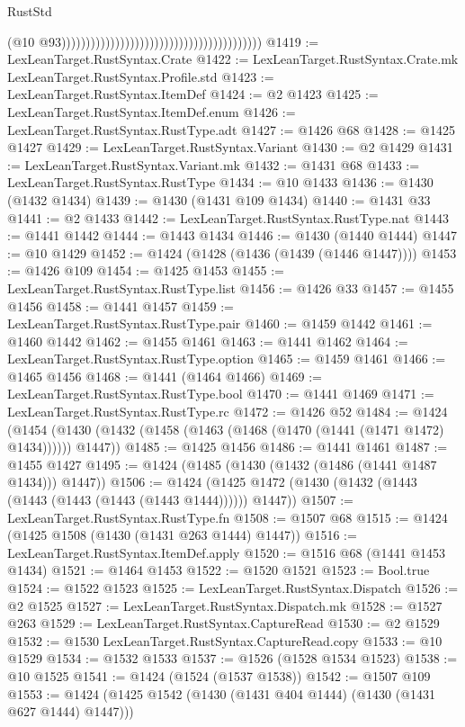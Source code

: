 \begin{lexlean}{RustStd}
\begin{coremodule}
{\begin{coremodule}
{{{{{{{{{{{{{{{{{{{{{{{{{{{{{{{{{{{{{{{{{{{{                                                                                    (@10
                                                                                      @93)))))))))))))))))))))))))))))))))))))))))
@1419 := LexLeanTarget.RustSyntax.Crate
@1422 := LexLeanTarget.RustSyntax.Crate.mk LexLeanTarget.RustSyntax.Profile.std
@1423 := LexLeanTarget.RustSyntax.ItemDef
@1424 := @2 @1423
@1425 := LexLeanTarget.RustSyntax.ItemDef.enum
@1426 := LexLeanTarget.RustSyntax.RustType.adt
@1427 := @1426 @68
@1428 := @1425 @1427
@1429 := LexLeanTarget.RustSyntax.Variant
@1430 := @2 @1429
@1431 := LexLeanTarget.RustSyntax.Variant.mk
@1432 := @1431 @68
@1433 := LexLeanTarget.RustSyntax.RustType
@1434 := @10 @1433
@1436 := @1430 (@1432 @1434)
@1439 := @1430 (@1431 @109 @1434)
@1440 := @1431 @33
@1441 := @2 @1433
@1442 := LexLeanTarget.RustSyntax.RustType.nat
@1443 := @1441 @1442
@1444 := @1443 @1434
@1446 := @1430 (@1440 @1444)
@1447 := @10 @1429
@1452 := @1424 (@1428 (@1436 (@1439 (@1446 @1447))))
@1453 := @1426 @109
@1454 := @1425 @1453
@1455 := LexLeanTarget.RustSyntax.RustType.list
@1456 := @1426 @33
@1457 := @1455 @1456
@1458 := @1441 @1457
@1459 := LexLeanTarget.RustSyntax.RustType.pair
@1460 := @1459 @1442
@1461 := @1460 @1442
@1462 := @1455 @1461
@1463 := @1441 @1462
@1464 := LexLeanTarget.RustSyntax.RustType.option
@1465 := @1459 @1461
@1466 := @1465 @1456
@1468 := @1441 (@1464 @1466)
@1469 := LexLeanTarget.RustSyntax.RustType.bool
@1470 := @1441 @1469
@1471 := LexLeanTarget.RustSyntax.RustType.rc
@1472 := @1426 @52
@1484 := @1424
    (@1454 (@1430 (@1432 (@1458 (@1463 (@1468 (@1470 (@1441 (@1471 @1472) @1434)))))) @1447))
@1485 := @1425 @1456
@1486 := @1441 @1461
@1487 := @1455 @1427
@1495 := @1424 (@1485 (@1430 (@1432 (@1486 (@1441 @1487 @1434))) @1447))
@1506 := @1424 (@1425 @1472 (@1430 (@1432 (@1443 (@1443 (@1443 (@1443 (@1443 @1444)))))) @1447))
@1507 := LexLeanTarget.RustSyntax.RustType.fn
@1508 := @1507 @68
@1515 := @1424 (@1425 @1508 (@1430 (@1431 @263 @1444) @1447))
@1516 := LexLeanTarget.RustSyntax.ItemDef.apply
@1520 := @1516 @68 (@1441 @1453 @1434)
@1521 := @1464 @1453
@1522 := @1520 @1521
@1523 := Bool.true
@1524 := @1522 @1523
@1525 := LexLeanTarget.RustSyntax.Dispatch
@1526 := @2 @1525
@1527 := LexLeanTarget.RustSyntax.Dispatch.mk
@1528 := @1527 @263
@1529 := LexLeanTarget.RustSyntax.CaptureRead
@1530 := @2 @1529
@1532 := @1530 LexLeanTarget.RustSyntax.CaptureRead.copy
@1533 := @10 @1529
@1534 := @1532 @1533
@1537 := @1526 (@1528 @1534 @1523)
@1538 := @10 @1525
@1541 := @1424 (@1524 (@1537 @1538))
@1542 := @1507 @109
@1553 := @1424 (@1425 @1542 (@1430 (@1431 @404 @1444) (@1430 (@1431 @627 @1444) @1447)))
}}}}}}}}}}}}}}}}}}}}}}}}}}}}}}}}}}}}}}}}}}}}
\end{coremodule}}
\end{coremodule}
\end{lexlean}
